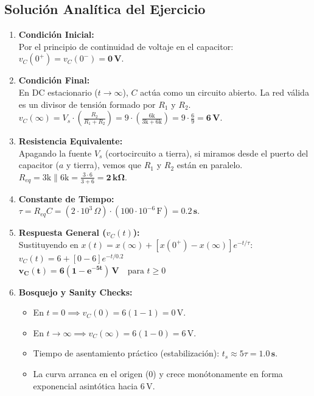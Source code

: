\documentclass[11pt, a4paper]{article}
\begin{document}
\subsection*{Solución Analítica del Ejercicio}
\begin{enumerate}
    \item \textbf{Condición Inicial:} \\
    Por el principio de continuidad de voltaje en el capacitor: \\
    $v_C(0^+) = v_C(0^-) = \mathbf{0\,\text{V}}$.
    
    \item \textbf{Condición Final:} \\
    En DC estacionario ($t \to \infty$), $C$ actúa como un circuito abierto. La red válida es un divisor de tensión formado por $R_1$ y $R_2$. \\
    $v_C(\infty) = V_s \cdot \left( \frac{R_2}{R_1 + R_2} \right) = 9 \cdot \left( \frac{6\text{k}}{3\text{k} + 6\text{k}} \right) = 9 \cdot \frac{6}{9} = \mathbf{6\,\text{V}}$.
    
    \item \textbf{Resistencia Equivalente:} \\
    Apagando la fuente $V_s$ (cortocircuito a tierra), si miramos desde el puerto del capacitor ($a$ y tierra), vemos que $R_1$ y $R_2$ están en paralelo. \\
    $R_{eq} = 3\text{k} \parallel 6\text{k} = \frac{3 \cdot 6}{3 + 6} = \mathbf{2\,\text{k}\Omega}$.
    
    \item \textbf{Constante de Tiempo:} \\
    $\tau = R_{eq} C = (2 \cdot 10^3\,\Omega) \cdot (100 \cdot 10^{-6}\,\text{F}) = \mathbf{0.2\,\text{s}}$.
    
    \item \textbf{Respuesta General ($v_C(t)$):} \\
    Sustituyendo en $x(t) = x(\infty) + [x(0^+) - x(\infty)]e^{-t/\tau}$: \\
    $v_C(t) = 6 + [0 - 6]e^{-t/0.2}$ \\
    $\mathbf{v_C(t) = 6 \left(1 - e^{-5t}\right) \,\text{V}} \quad \text{para } t \ge 0$
    
    \item \textbf{Bosquejo y Sanity Checks:} \\
    \begin{itemize}
        \item En $t=0 \implies v_C(0) = 6(1-1) = 0\,\text{V}$.
        \item En $t \to \infty \implies v_C(\infty) = 6(1-0) = 6\,\text{V}$.
        \item Tiempo de asentamiento práctico (estabilización): $t_s \approx 5\tau = \mathbf{1.0\,\text{s}}$.
        \item La curva arranca en el origen (0) y crece monótonamente en forma exponencial asintótica hacia $6\,\text{V}$.
    \end{itemize}
\end{enumerate}
\end{document}
